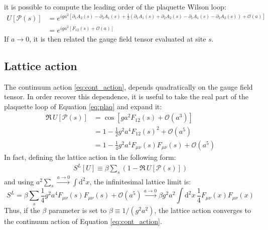 it is possible to compute the leading order of the plaquette Wilson loop:
\begin{equation}\label{eq:plaq}
    \begin{aligned}
        U[\mathcal P(s)] &= e^{iga^2[\partial_1A_2(s) - \partial_2A_1(s) + \frac{1}{2}(\partial_1A_1(s) + \partial_2A_2(s) - \partial_1A_1(s) - \partial_2A_2(s)) %
                                   + \mathcal O\left(a\right)]} \\
                         &= e^{iga^2\left[F_{12}(s) + \mathcal O\left(a\right)\right]}
    \end{aligned}
\end{equation}
If $a \to 0$, it is then related the gauge field tensor evaluated at site $s$.

\subsection*{Lattice action}

The continuum action \eqref{eq:cont_action}, depends quadratically on the gauge field tensor.
In order recover this dependence, it is useful to take the real part of the plaquette loop of Equation \eqref{eq:plaq} and expand it:
\begin{align*}
    \Re\,U[\mathcal P(s)] &= \cos\left[ga^2F_{12}(s) + \mathcal O\left(a^3\right)\right] \\
                          &= 1 - \frac{1}{2}g^2a^4F_{12}(s)^2 + \mathcal O\left(a^5\right) \\
                          &= 1 - \frac{1}{4}g^2a^4F_{\mu\nu}(s)F_{\mu\nu}(s) + \mathcal O\left(a^5\right)
\end{align*}
In fact, defining the lattice action in the following form:
\begin{equation}\label{eq:lat_action}
    \begin{aligned}
        S^L[U] \equiv \beta\sum_s\left(1-\Re\,U[\mathcal P(s)]\right)
    \end{aligned}
\end{equation}
and using $a^2\sum_s \xrightarrow{a\to0} \int\mathrm d^2x$, the infinitesimal lattice limit is:
\[
    S^L = \beta\sum_s\frac{1}{4}g^2a^4F_{\mu\nu}(s)F_{\mu\nu}(s) + \mathcal O\left(a^5\right)
      \xrightarrow{a\to0} \beta g^2a^2\int\mathrm d^2x\,\frac{1}{4}F_{\mu\nu}(x)F_{\mu\nu}(x)
\]
Thus, if the $\beta$ parameter is set to $\beta \equiv 1/(g^2a^2)$,
the lattice action converges to the continuum action of Equation \eqref{eq:cont_action}.

